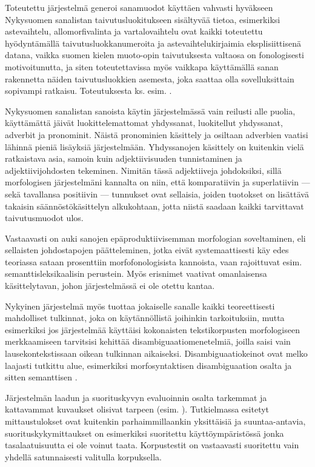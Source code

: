 \documentclass[free]{flammie}
\begin{document}
Toteutettu järjestelmä generoi sanamuodot käyttäen vahvasti hyväkseen Nykysuomen sanalistan taivutusluokitukseen sisältyvää tietoa, esimerkiksi astevaihtelu,
allomorfivalinta ja vartalovaihtelu ovat kaikki toteutettu hyödyntämällä taivutusluokkanumeroita ja astevaihtelukirjaimia eksplisiittisenä datana, vaikka suomen
kielen muoto-opin taivutuksesta valtaosa on fonologisesti motivoitunutta, ja siten
toteutettavissa myös vaikkapa käyttämällä sanan rakennetta näiden taivutusluokkien asemesta, joka saattaa olla sovelluksittain sopivampi ratkaisu. Toteutuksesta
ks. esim. \cite{koskenniemi1983twolevel}.

Nykysuomen sanalistan sanoista käytin järjestelmässä vain reilusti alle puolia,
käyttämättä jäivät luokittelemattomat yhdyssanat, luokitellut yhdyssanat, adverbit ja pronominit. Näistä pronominien käsittely ja osiltaan adverbien vaatisi lähinnä pieniä lisäyksiä järjestelmään. Yhdyssanojen käsittely on kuitenkin vielä ratkaistava asia, samoin kuin adjektiivisuuden tunnistaminen ja adjektiivijohdosten
tekeminen. Nimitän tässä adjektiiveja johdoksiksi, sillä morfologisen järjestelmäni kannalta on niin, että komparatiivin ja superlatiivin — sekä tavallansa positiivin
— tunnukset ovat sellaisia, joiden tuotokset on lisättävä takaisin säännöstökäsittelyn alkukohtaan, jotta niistä saadaan kaikki tarvittavat taivutusmuodot ulos.

Vastaavasti on auki sanojen epäproduktiivisemman morfologian soveltaminen, eli
sellaisten johdostapojen päätteleminen, jotka eivät systemaattisesti käy edes teoriassa sataan prosenttiin morfofonologisista kannoista, vaan rajoittuvat esim. semanttisleksikaalisin perustein. Myös erisnimet vaativat omanlaisensa käsittelytavan, johon järjestelmässä ei ole otettu kantaa.

Nykyinen järjestelmä myös tuottaa jokaiselle sanalle kaikki teoreettisesti mahdolliset tulkinnat, joka on käytännöllistä joihinkin tarkoituksiin, mutta esimerkiksi jos järjestelmää käyttäisi kokonaisten tekstikorpusten morfologiseen merkkaamiseen tarvitsisi kehittää disambiguaatiomenetelmiä, joilla saisi vain lausekontekstissaan oikean tulkinnan aikaiseksi. Disambiguaatiokeinot ovat melko laajasti
tutkittu alue, esimerkiksi morfosyntaktisen disambiguaation osalta
\cite{voutilainen1997,karlsson1995} ja sitten semanttisen \cite{linden2005}.

Järjestelmän laadun ja suorituskyvyn evaluoinnin osalta tarkemmat ja kattavammat
kuvaukset olisivat tarpeen (esim. \cite{kanthak2004}). Tutkielmassa
esitetyt mittaustulokset ovat kuitenkin parhaimmillaankin yksittäisiä ja
suuntaa-antavia, suorituskykymittaukset on esimerkiksi suoritettu käyttöympäristössä jonka tasalaatuisuutta ei ole voinut taata. Korpustestit on vastaavasti suoritettu vain
yhdellä satunnaisesti valitulla korpuksella.
\end{document}
